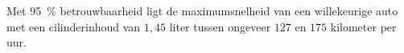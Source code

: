 \begin{enumerate}[label=(\alph*)]
{        Met \SI{95}{\percent} betrouwbaarheid ligt de maximumsnelheid van een willekeurige auto met een cilinderinhoud van $1,45$ liter tussen ongeveer $127$ en $175$ kilometer per uur.
        \begin{center}
        \end{center}
    }
\end{enumerate}
